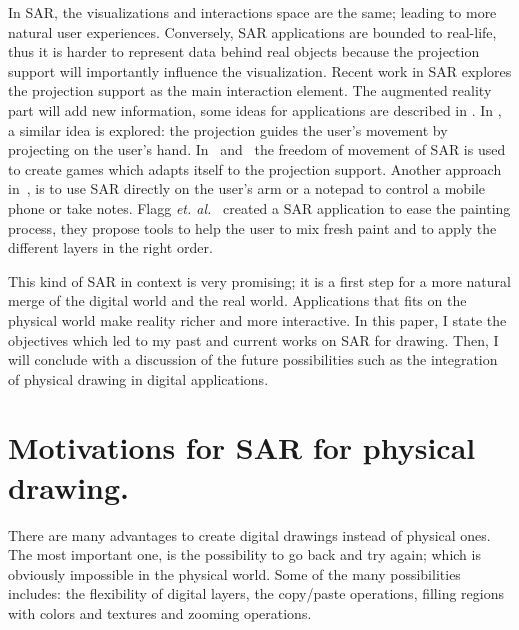 \documentclass{article}
\begin{document}
In SAR, the visualizations and interactions space are the same; leading to more natural user experiences. Conversely, SAR applications are bounded 
to real-life, thus it is harder to represent data behind real objects because the projection
support will importantly influence the visualization.
Recent work in SAR explores the projection support as the main interaction element. The 
augmented reality part will add new information, some ideas for applications are described
in \cite{mistry2009sixthsense}. 
In \cite{sodhi2012lightguide}, a similar idea is explored: the projection guides the user's movement by projecting on the user's hand. 
In~\cite{wilson2007depth} and~\cite{jones2010build} the freedom of movement of SAR is used to create games which adapts itself to the projection support. Another approach in~\cite{harrison2011omnitouch}, is to use SAR directly on the user's arm or a notepad to control a mobile phone or take notes. Flagg \textit{et. al.}~\cite{flagg2006projector} created a SAR application to ease the painting process, they propose tools to help the user to mix fresh paint and to apply the different layers in the right order. 

This kind of SAR in context is very promising; it is a first step for a more natural merge of the digital world and the real world. 
Applications that fits on the physical world make reality richer and more interactive.
In this paper, I state the objectives which led to my past and current works on SAR for drawing.
 Then, I will conclude with a discussion of the future possibilities such as the integration of physical drawing in digital applications.



\section{Motivations for SAR for physical drawing.}


There are many advantages to create digital drawings instead of physical ones. The most important one, is the possibility to go back and try again; which is obviously impossible in the physical world. Some of the many possibilities includes: the flexibility of digital layers, the copy/paste operations, filling regions with colors and textures and zooming operations.
\end{document}
